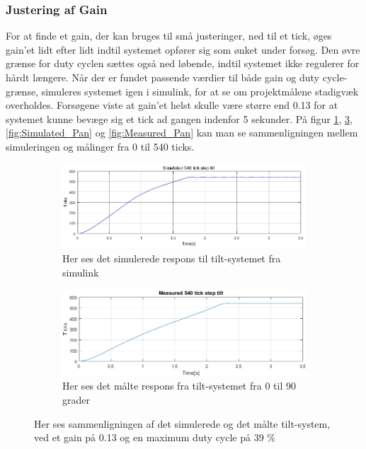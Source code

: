 \subsubsection{Justering af Gain}

For at finde et gain, der kan bruges til små justeringer, ned til et tick, øges gain'et lidt efter lidt indtil systemet opfører sig som ønket under forsøg. Den øvre grænse for duty cyclen sættes også ned løbende, indtil systemet ikke regulerer for hårdt længere. Når der er fundet passende værdier til både gain og duty cycle-grænse, simuleres systemet igen i simulink, for at se om projektmålene stadigvæk overholdes. Forsøgene viste at gain'et helst skulle være større end 0.13 for at systemet kunne bevæge sig et tick ad gangen indenfor 5 sekunder. På figur \ref{fig:Simulated_Tilt}, \ref{fig:Measured_Tilt}, \ref{fig:Simulated_Pan} og \ref{fig:Measured_Pan} kan man se sammenligningen mellem simuleringen og målinger fra 0 til 540 ticks.

\begin{figure}[t!]
    \centering
    \begin{subfigure}[t]{0.8\textwidth}
     \centering
        \includegraphics[width=1\textwidth]{Billeder/Simulated_Response_Tilt.png}
        \caption{Her ses det simulerede respons til tilt-systemet fra simulink}
        \label{fig:Simulated_Tilt}
    \end{subfigure}
    \begin{subfigure}[b]{0.8\textwidth}
     \centering
        \includegraphics[width=1\textwidth]{Billeder/Measured_Response_Tilt.PNG}
        \caption{Her ses det målte respons fra tilt-systemet fra 0 til 90 grader}
        \label{fig:Measured_Tilt}
    \end{subfigure}
    \caption{Her ses sammenligningen af det simulerede og det målte tilt-system, ved et gain på 0.13 og en maximum duty cycle på 39 $\%$}
\end{figure}

